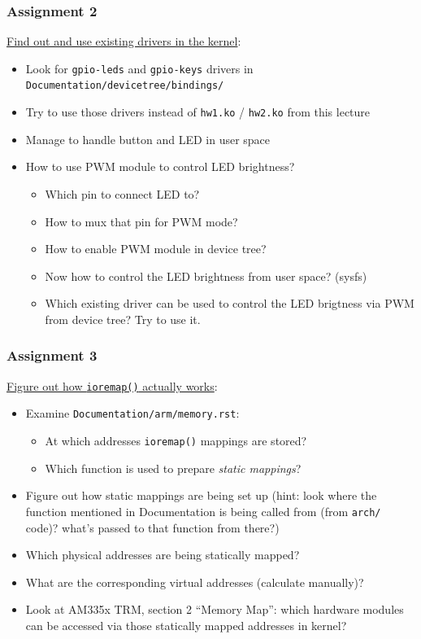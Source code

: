 \documentclass[aspectratio=169,usenames,dvipsnames]{beamer}
\newcounter{cont}
\begin{document}
\begin{frame}
  \frametitle{Assignment 2}
  \underline{Find out and use existing drivers in the kernel}:
  \begin{itemize}
    \item Look for \texttt{gpio-leds} and \texttt{gpio-keys} drivers in
          \texttt{Documentation/devicetree/bindings/}
    \item Try to use those drivers instead of \texttt{hw1.ko} / \texttt{hw2.ko}
          from this lecture
    \item Manage to handle button and LED in user space
    \item How to use PWM module to control LED brightness?
    \begin{itemize}
      \item Which pin to connect LED to?
      \item How to mux that pin for PWM mode?
      \item How to enable PWM module in device tree?
      \item Now how to control the LED brightness from user space? (sysfs)
      \item Which existing driver can be used to control the LED brigtness via
            PWM from device tree? Try to use it.
    \end{itemize}
  \end{itemize}
\end{frame}

\begin{frame}
  \frametitle{Assignment 3}
  \underline{Figure out how \texttt{ioremap()} actually works}:
  \begin{itemize}
    \item Examine \texttt{Documentation/arm/memory.rst}:
    \begin{itemize}
      \item At which addresses \texttt{ioremap()} mappings are stored?
      \item Which function is used to prepare \textit{static mappings}?
    \end{itemize}
    \item Figure out how static mappings are being set up (hint: look where
          the function mentioned in Documentation is being called from
          (from \texttt{arch/} code)? what's passed to that function from
          there?)
    \item Which physical addresses are being statically mapped?
    \item What are the corresponding virtual addresses (calculate manually)?
    \item Look at AM335x TRM, section 2 ``Memory Map'': which hardware modules
          can be accessed via those statically mapped addresses in kernel?
  \end{itemize}
\end{frame}
\end{document}
